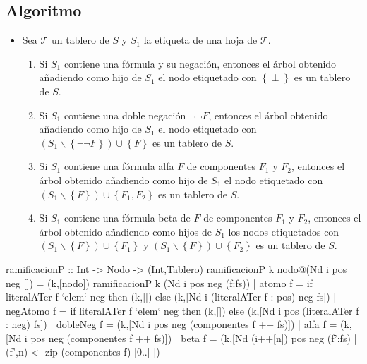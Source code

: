 \documentclass{beamer}
\begin{document}
\subsection{Algoritmo}
\begin{frame}
\begin{itemize}
\item Sea $\mathcal{T}$ un tablero de $S$ y $S_1$ la etiqueta de
  una hoja  de $\mathcal{T}$.
  \begin{enumerate}
  \item Si $S_1$ contiene una fórmula y su negación, entonces el árbol
    obtenido añadiendo como hijo de $S_1$ el nodo etiquetado con
    $\left\{ \perp \right\}$ es un tablero de $S$.
  \item Si $S_1$ contiene una doble negación $\neg \neg F$, entonces
    el árbol obtenido añadiendo como hijo de $S_1$ el nodo etiquetado
    con $(S_1 \backslash \left\{\neg \neg F \right\})\cup \left\{ F \right\}$
    es un tablero de $S$.
  \item Si $S_1$ contiene una fórmula alfa $F$ de componentes $F_1$ y $F_2$,
    entonces el árbol obtenido añadiendo como hijo de $S_1$ el nodo etiquetado
    con $(S_1 \backslash \left\{ F \right\})\cup \left\{ F_1,F_2 \right\}$
    es un tablero de $S$.
  \item Si $S_1$ contiene una fórmula beta de $F$ de componentes $F_1$ y $F_2$,
    entonces el árbol obtenido añadiendo como hijos de $S_1$ los nodos
    etiquetados con $(S_1 \backslash \left\{ F \right\}) \cup \left\{ F_1 \right\}$ y
    $(S_1 \backslash \left\{ F \right\})\cup \left\{ F_2 \right\}$ es un tablero
    de $S$.
  \end{enumerate}
\end{itemize}  
\end{frame}

\begin{frame}[fragile]
\begin{code}
ramificacionP :: Int -> Nodo -> (Int,Tablero)
ramificacionP k nodo@(Nd i pos neg []) = (k,[nodo])
ramificacionP k (Nd i pos neg (f:fs))
  | atomo    f = 
      if literalATer f `elem` neg
      then (k,[])
      else (k,[Nd i (literalATer f : pos) neg fs])
  | negAtomo f = 
      if literalATer f `elem` neg
      then (k,[]) 
      else (k,[Nd i pos (literalATer f : neg) fs])
  | dobleNeg f = 
      (k,[Nd i pos neg (componentes f ++ fs)])
  | alfa     f = 
      (k,[Nd i pos neg (componentes f ++ fs)])
  | beta     f = 
      (k,[Nd (i++[n]) pos neg (f':fs)
         | (f',n) <- zip (componentes f) [0..] ])
  
\end{code}  
\end{frame}
\end{document}
